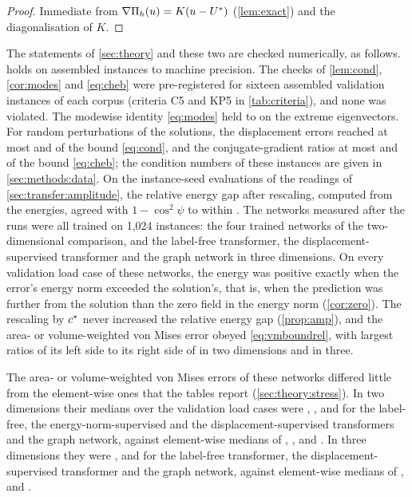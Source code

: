 \begin{proof}
Immediate from $\nabla\Pi_h(u)=K(u-U^{\ast})$ (\cref{lem:exact}) and the diagonalisation of
$K$.
\end{proof}

The statements of \cref{sec:theory} and these two are checked numerically, as follows.
 holds on assembled instances to machine precision. The checks of
\cref{lem:cond}, \cref{cor:modes} and \eqref{eq:cheb} were pre-registered for sixteen
assembled validation instances of each corpus (criteria C5 and KP5 in \cref{tab:criteria}), and none was violated. The modewise identity
\eqref{eq:modes} held to \numModesPhrase{} on the extreme eigenvectors. For random
perturbations of the solutions, the displacement errors
reached at most \numCondTwo{} and \numCondThree{} of the bound \eqref{eq:cond}, and the
conjugate-gradient ratios at most \numChebTwo{} and \numChebThree{} of the bound
\eqref{eq:cheb}; the condition numbers of these instances are given in
\cref{sec:methods:data}. On the \numAmpRows{} instance-seed evaluations of the readings of
\cref{sec:transfer:amplitude}, the relative energy gap after rescaling, computed from the
energies, agreed with $1-\cos^2\psi$ to within \numAmpIdentity{}. The networks measured after the runs were all trained on 1,024 instances: the four trained
networks of the two-dimensional comparison, and the label-free transformer, the
displacement-supervised transformer and the graph network in three dimensions. On every
validation load case of these networks, the energy was positive exactly when the error's
energy norm exceeded the solution's, that is, when the prediction was further from the
solution than the zero field in the energy norm (\cref{cor:zero}). The rescaling by $c^{\ast}$
never increased the relative energy gap
(\cref{prop:amp}), and the area- or volume-weighted von Mises error obeyed
\eqref{eq:vmboundrel}, with largest ratios of its left side to its right side of
\numSpecBoundMax{} in two dimensions and \numFieldBoundMax{} in three.

The area- or volume-weighted von Mises errors of these networks differed little from the
element-wise ones that the tables report (\cref{sec:theory:stress}). In two dimensions their
medians over the validation load cases were \numSpecVmAreaFree{}, \numSpecVmAreaKnorm{},
\numSpecVmAreaLab{} and \numSpecVmAreaMgn{} for the label-free, the energy-norm-supervised
and the displacement-supervised transformers and the graph network, against element-wise medians of \numSpecVmElemFree{}, \numSpecVmElemKnorm{},
\numSpecVmElemLab{} and \numSpecVmElemMgn{}. In three dimensions they were \numFieldVmVolFree{}, \numFieldVmVolLab{}
and \numFieldVmVolMgn{} for the label-free transformer, the displacement-supervised
transformer and the graph network, against element-wise medians of \numFieldVmElemFree{},
\numFieldVmElemLab{} and \numFieldVmElemMgn{}.

